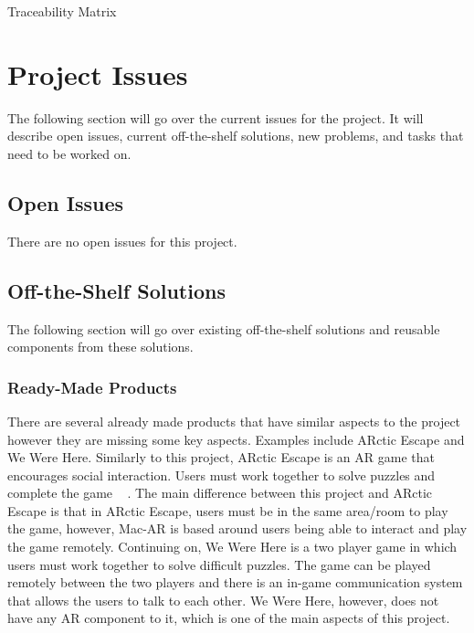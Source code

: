\documentclass[12pt]{article}
\begin{document}
\begin{table}[H]
\begin{adjustwidth}{-0.8in}{-1.2in}
{}
\caption{Traceability Matrix}
    \label{tab:matrix2}
\end{adjustwidth}
\end{table}





\section{Project Issues}
The following section will go over the current issues for the project. It will describe open issues, current off-the-shelf solutions, new problems, and tasks that need to be worked on.

\subsection{Open Issues}
There are no open issues for this project.

\subsection{Off-the-Shelf Solutions}
The following section will go over existing off-the-shelf solutions and reusable components from these solutions.

\subsubsection{Ready-Made Products}
There are several already made products that have similar aspects to the project however they are missing some key aspects. Examples include ARctic Escape and We Were Here. Similarly to this project, ARctic Escape is an AR game that encourages social interaction. Users must work together to solve puzzles and complete the game ~\citep{ARcticEscape} . The main difference between this project and ARctic Escape is that in ARctic Escape, users must be in the same area/room to play the game, however, Mac-AR is based around users being able to interact and play the game remotely. Continuing on, We Were Here is a two player game in which users must work together to solve difficult puzzles. The game can be played remotely between the two players and there is an in-game communication system that allows the users to talk to each other. We Were Here, however, does not have any AR component to it, which is one of the main aspects of this project.
\end{document}
